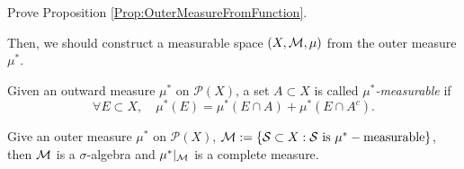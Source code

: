 \begin{exc}
    Prove Proposition \ref{Prop:OuterMeasureFromFunction}.
\end{exc}
Then, we should construct a measurable space 
$(X,\mathcal{M},\mu)$ from the outer measure $\mu^{*}$. 
\begin{defn}
    \label{Defn:MuStarMeasurable}
    Given an outward measure $\mu^{*}$ on $\mathcal{P}(X)$, 
    a set $A\subset X$ is called \textit{$\mu^{*}$-measurable} 
    if 
    \begin{equation}
        \label{Equ:MeasurableCondition}
        \forall E\subset X,\quad \mu^{*}(E)=\mu^{*}(E\cap A)
        +\mu^{*}(E\cap A^c).
    \end{equation}
\end{defn}
\begin{thm}[Caratheodory]
    \label{Thm:CaratheodoryThm}
    Give an outer measure $\mu^{*}$ on $\mathcal{P}(X)$, 
    $\mathcal{M}:=\{\mathcal{S}\subset X:\mathcal{S}\text{ is }\mu^*-\text{measurable}\}$, 
    then $\mathcal{M}$ is a $\sigma$-algebra and 
    $\mu^{*}|_{\mathcal{M}}$ is a complete measure. 
\end{thm}
